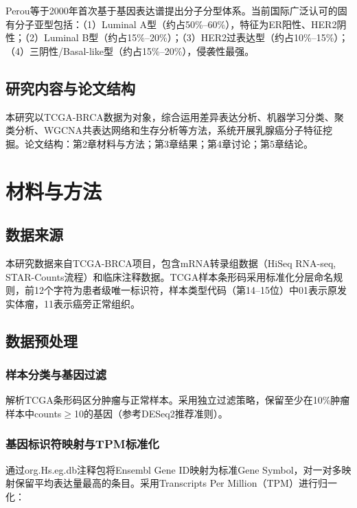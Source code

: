 \documentclass[12pt,a4paper]{article}
\begin{document}
Perou等\cite{perou2000}于2000年首次基于基因表达谱提出分子分型体系。当前国际广泛认可的固有分子亚型包括：（1）Luminal A型（约占50\%--60\%），特征为ER阳性、HER2阴性；（2）Luminal B型（约占15\%--20\%）；（3）HER2过表达型（约占10\%--15\%）；（4）三阴性/Basal-like型（约占15\%--20\%），侵袭性最强。

\subsection{研究内容与论文结构}

本研究以TCGA-BRCA数据为对象，综合运用差异表达分析、机器学习分类、聚类分析、WGCNA共表达网络和生存分析等方法，系统开展乳腺癌分子特征挖掘。论文结构：第2章材料与方法；第3章结果；第4章讨论；第5章结论。

\section{材料与方法}

\subsection{数据来源}

本研究数据来自TCGA-BRCA项目，包含mRNA转录组数据（HiSeq RNA-seq, STAR-Counts流程）和临床注释数据。TCGA样本条形码采用标准化分层命名规则，前12个字符为患者级唯一标识符，样本类型代码（第14--15位）中01表示原发实体瘤，11表示癌旁正常组织。

\subsection{数据预处理}

\subsubsection{样本分类与基因过滤}

解析TCGA条形码区分肿瘤与正常样本。采用独立过滤策略，保留至少在10\%肿瘤样本中counts$\geq$10的基因（参考DESeq2推荐准则）。

\subsubsection{基因标识符映射与TPM标准化}

通过org.Hs.eg.db注释包将Ensembl Gene ID映射为标准Gene Symbol，对一对多映射保留平均表达量最高的条目。采用Transcripts Per Million（TPM）进行归一化：
\end{document}
